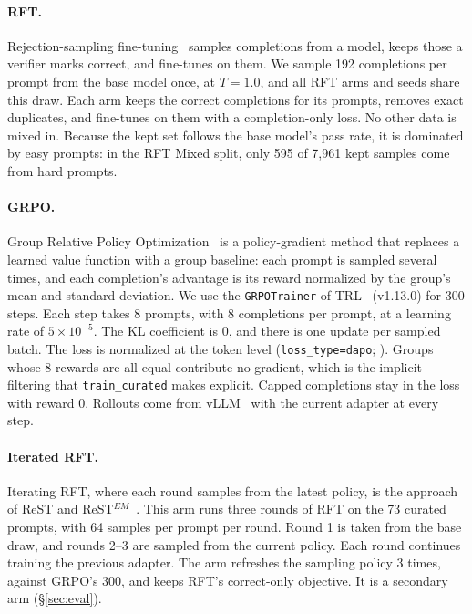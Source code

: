 \documentclass{article}
\begin{document}
\paragraph{RFT.} Rejection-sampling fine-tuning~\citep{yuan2023scaling} samples completions from a model, keeps those a verifier marks correct, and fine-tunes on them. We sample 192 completions per prompt from the base model once, at $T{=}1.0$, and all RFT arms and seeds share this draw. Each arm keeps the correct completions for its prompts, removes exact duplicates, and fine-tunes on them with a completion-only loss. No other data is mixed in. Because the kept set follows the base model's pass rate, it is dominated by easy prompts: in the RFT Mixed split, only 595 of 7{,}961 kept samples come from hard prompts.

\paragraph{GRPO.} Group Relative Policy Optimization~\citep{shao2024deepseekmath}
is a policy-gradient method that replaces a learned value function with a group baseline: each prompt is sampled several times, and each completion's advantage is its reward normalized by the group's mean and standard deviation. We use the \texttt{GRPOTrainer} of TRL~\citep{vonwerra2020trl} (v1.13.0) for 300 steps. Each
step takes 8 prompts, with 8 completions per prompt, at a learning rate of $5{\times}10^{-5}$. The KL coefficient is 0, and there is one update per sampled batch. The loss is normalized at the token level (\texttt{loss\_type=dapo}; \citealp{yu2025dapo}). Groups whose 8 rewards are all equal contribute no gradient, which is the implicit filtering that \texttt{train\_curated} makes explicit. Capped completions stay in the loss with reward 0. Rollouts come from vLLM~\citep{kwon2023vllm} with the current adapter at every step.

\paragraph{Iterated RFT.} Iterating RFT, where each round samples from the latest policy, is the approach of ReST and ReST$^{EM}$~\citep{gulcehre2023rest,singh2024beyond}. This arm runs three rounds of RFT on the 73 curated prompts, with 64 samples per prompt per round. Round 1 is taken from the base draw, and rounds 2--3 are sampled from the current policy. Each round continues training the previous adapter. The arm refreshes the sampling policy 3 times, against GRPO's 300, and keeps RFT's correct-only objective. It is a secondary arm (\S\ref{sec:eval}).
\end{document}
